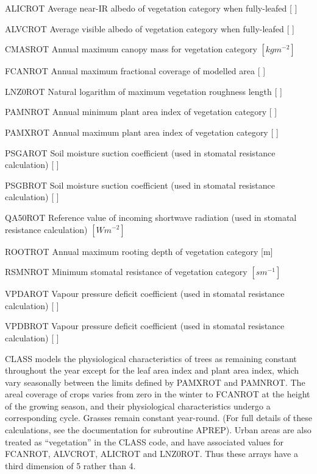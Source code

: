 \begin{DoxyItemize}
\item A\+L\+I\+C\+R\+O\+T Average near-\/\+I\+R albedo of vegetation category when fully-\/leafed \mbox{[} \mbox{]}
\item A\+L\+V\+C\+R\+O\+T Average visible albedo of vegetation category when fully-\/leafed \mbox{[} \mbox{]}
\item C\+M\+A\+S\+R\+O\+T Annual maximum canopy mass for vegetation category $[kg m^{-2} ]$
\item F\+C\+A\+N\+R\+O\+T Annual maximum fractional coverage of modelled area \mbox{[} \mbox{]}
\item L\+N\+Z0\+R\+O\+T Natural logarithm of maximum vegetation roughness length \mbox{[} \mbox{]}
\item P\+A\+M\+N\+R\+O\+T Annual minimum plant area index of vegetation category \mbox{[} \mbox{]}
\item P\+A\+M\+X\+R\+O\+T Annual maximum plant area index of vegetation category \mbox{[} \mbox{]}
\item P\+S\+G\+A\+R\+O\+T Soil moisture suction coefficient (used in stomatal resistance calculation) \mbox{[} \mbox{]}
\item P\+S\+G\+B\+R\+O\+T Soil moisture suction coefficient (used in stomatal resistance calculation) \mbox{[} \mbox{]}
\item Q\+A50\+R\+O\+T Reference value of incoming shortwave radiation (used in stomatal resistance calculation) $[W m^{-2} ]$
\item R\+O\+O\+T\+R\+O\+T Annual maximum rooting depth of vegetation category \mbox{[}m\mbox{]}
\item R\+S\+M\+N\+R\+O\+T Minimum stomatal resistance of vegetation category $[s m^{-1} ]$
\item V\+P\+D\+A\+R\+O\+T Vapour pressure deficit coefficient (used in stomatal resistance calculation) \mbox{[} \mbox{]}
\item V\+P\+D\+B\+R\+O\+T Vapour pressure deficit coefficient (used in stomatal resistance calculation) \mbox{[} \mbox{]}
\end{DoxyItemize}

C\+L\+A\+S\+S models the physiological characteristics of trees as remaining constant throughout the year except for the leaf area index and plant area index, which vary seasonally between the limits defined by P\+A\+M\+X\+R\+O\+T and P\+A\+M\+N\+R\+O\+T. The areal coverage of crops varies from zero in the winter to F\+C\+A\+N\+R\+O\+T at the height of the growing season, and their physiological characteristics undergo a corresponding cycle. Grasses remain constant year-\/round. (For full details of these calculations, see the documentation for subroutine A\+P\+R\+E\+P). Urban areas are also treated as “vegetation” in the C\+L\+A\+S\+S code, and have associated values for F\+C\+A\+N\+R\+O\+T, A\+L\+V\+C\+R\+O\+T, A\+L\+I\+C\+R\+O\+T and L\+N\+Z0\+R\+O\+T. Thus these arrays have a third dimension of 5 rather than 4.

